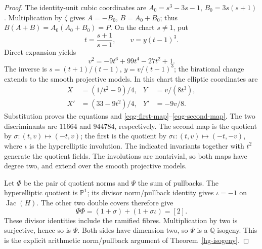 \begin{proof}
The identity-unit cubic coordinates are
\(A_0=s^3-3s-1\), \(B_0=3s(s+1)\).
Multiplication by \(\zeta\) gives \(A=-B_0\), \(B=A_0+B_0\);
thus \(B(A+B)=A_0(A_0+B_0)=P\).
On the chart \(s\ne1\), put
\[
 t=\frac{s+1}{s-1},\qquad v=y(t-1)^3.
\]
Direct expansion yields
\begin{equation}\label{eqg-even-sextic}
 v^2=-9t^6+99t^4-27t^2+1.
\end{equation}
The inverse is \(s=(t+1)/(t-1)\), \(y=v/(t-1)^3\);
the birational change extends to the smooth projective models.
In this chart the elliptic coordinates are
\begin{align*}
 X&=(1/t^2-9)/4,&Y&=v/(8t^3),\\
 X'&=(33-9t^2)/4,&Y'&=-9v/8.
\end{align*}
Substitution proves the equations and
\eqref{eqg-first-map}--\eqref{eqg-second-map}.
The two discriminants are \(11664\) and \(944784\), respectively.
The second map is the quotient by \(\sigma:(t,v)\mapsto(-t,v)\);
the first is the quotient by \(\sigma\iota:(t,v)\mapsto(-t,-v)\),
where \(\iota\) is the hyperelliptic involution. The indicated
invariants together with \(t^2\) generate the quotient fields.
The involutions are nontrivial, so both maps have degree two,
and extend over the smooth projective models.

Let \(\Phi\) be the pair of quotient norms and \(\Psi\) the sum
of pullbacks. The hyperelliptic quotient is \(\mathbb P^1\);
its divisor norm/pullback identity gives \(\iota=-1\) on
\(\operatorname{Jac}(H)\). The other two double covers therefore give
\begin{equation}\label{eqg-times-two}
 \Psi\Phi=(1+\sigma)+(1+\sigma\iota)=[2].
\end{equation}
These divisor identities include the ramified fibres.
Multiplication by two is surjective, hence so is \(\Psi\).
Both sides have dimension two, so \(\Psi\) is a
\(\mathbb Q\)-isogeny. This is the explicit arithmetic
norm/pullback argument of Theorem~\ref{hg-isogeny}.
\end{proof}

